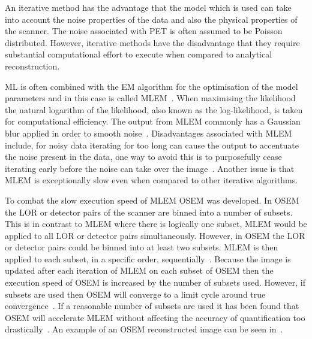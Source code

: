             An iterative method has the advantage that the model which is used can take into account the noise properties of the data and also the physical properties of the scanner. The noise associated with \gls{PET} is often assumed to be Poisson distributed. However, iterative methods have the disadvantage that they require substantial computational effort to execute when compared to analytical reconstruction.
            
            \gls{ML} is often combined with the \gls{EM} algorithm for the optimisation of the model parameters and in this case is called \gls{MLEM}~\parencite{MLEMBib, PETMLEMBib, PETMLEM2Bib}. When maximising the likelihood the natural logarithm of the likelihood, also known as the log-likelihood, is taken for computational efficiency. The output from \gls{MLEM} commonly has a Gaussian blur applied in order to smooth noise~\parencite{PETMLEMFiltBib}. Disadvantages associated with \gls{MLEM} include, for noisy data iterating for too long can cause the output to accentuate the noise present in the data, one way to avoid this is to purposefully cease iterating early before the noise can take over the image~\parencite{PETMLEMTerminationBib}. Another issue is that \gls{MLEM} is exceptionally slow even when compared to other iterative algorithms. %
            
            To combat the slow execution speed of \gls{MLEM} \gls{OSEM} was developed. In \gls{OSEM} the \gls{LOR} or detector pairs of the scanner are binned into a number of subsets. This is in contrast to \gls{MLEM} where there is logically one subset, \gls{MLEM} would be applied to all \gls{LOR} or detector pairs simultaneously. However, in \gls{OSEM} the \gls{LOR} or detector pairs could be binned into at least two subsets. \gls{MLEM} is then applied to each subset, in a specific order, sequentially~\parencite{Hudson1994}. Because the image is updated after each iteration of \gls{MLEM} on each subset of \gls{OSEM} then the execution speed of \gls{OSEM} is increased by the number of subsets used. However, if%
            subsets are used %
            then  \gls{OSEM} will converge to a limit cycle around true convergence~\parencite{Mettivier2011}. If a reasonable number of subsets are used it has been found that \gls{OSEM} will accelerate \gls{MLEM} without affecting the accuracy of quantification too drastically~\parencite{Morey2013}. An example of an \gls{OSEM} reconstructed image can be seen in~.
            
